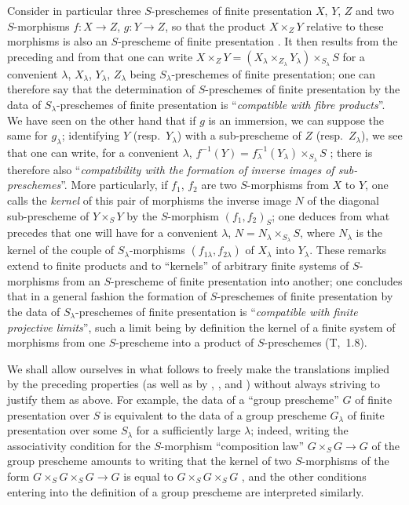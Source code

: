 \begin{scholium}[8.8.3]
Consider in particular three $S$-preschemes of finite presentation $X$, $Y$, $Z$ and two $S$-morphisms $f:X\to Z$, $g:Y\to Z$, so that the product $X\times_Z Y$ relative to these morphisms is also an $S$-prescheme of finite presentation .
It then results from the preceding and from  that one can write $X\times_Z Y=(X_\lambda\times_{Z_\lambda}Y_\lambda)\times_{S_\lambda}S$ for a convenient $\lambda$, $X_\lambda$, $Y_\lambda$, $Z_\lambda$ being $S_\lambda$-preschemes of finite presentation; one can therefore say that the determination of $S$-preschemes of finite presentation by the data of $S_\lambda$-preschemes of finite presentation is ``\emph{compatible with fibre products}''.
We have seen on the other hand  that if $g$ is an immersion, we can suppose the same for $g_\lambda$; identifying $Y$ (resp.\ $Y_\lambda$) with a sub-prescheme of $Z$ (resp.\ $Z_\lambda$), we see that one can write, for a convenient $\lambda$, $f^{-1}(Y)=f_\lambda^{-1}(Y_\lambda)\times_{S_\lambda}S$ ;
there is therefore also ``\emph{compatibility with the formation of inverse images of sub-preschemes}''.
More particularly, if $f_1$, $f_2$ are two $S$-morphisms from $X$ to $Y$, one calls the \emph{kernel} of this pair of morphisms the inverse image $N$ of the diagonal sub-prescheme of $Y\times_S Y$ by the $S$-morphism $(f_1,f_2)_S$; one deduces from what precedes that one will have for a convenient $\lambda$, $N=N_\lambda\times_{S_\lambda}S$, where $N_\lambda$ is the kernel of the couple of $S_\lambda$-morphisms $(f_{1\lambda},f_{2\lambda})$ of $X_\lambda$ into $Y_\lambda$.
These remarks extend to finite products and to ``kernels'' of arbitrary finite systems of $S$-morphisms from an $S$-prescheme of finite presentation into
another; one concludes that in a general fashion the formation of $S$-preschemes of finite presentation by the data of $S_\lambda$-preschemes of finite presentation is ``\emph{compatible with finite projective limits}'', such a limit being by definition the kernel of a finite system of morphisms from one $S$-prescheme into a product of $S$-preschemes (T,~1.8).

We shall allow ourselves in what follows to freely make the translations implied by the preceding properties (as well as by , , and ) without always striving to justify them as above.
For example, the data of a ``group prescheme'' $G$ of finite presentation over $S$ is equivalent to the data of a group prescheme $G_\lambda$ of finite presentation over some $S_\lambda$ for a sufficiently large $\lambda$; indeed, writing the associativity condition for the $S$-morphism ``composition law'' $G\times_S G\to G$ of the group prescheme amounts to writing that the kernel of two $S$-morphisms of the form $G\times_S G\times_S G\to G$ is equal to $G\times_S G\times_S G$ , and the other conditions entering into the definition of a group prescheme are interpreted similarly.
\end{scholium}

